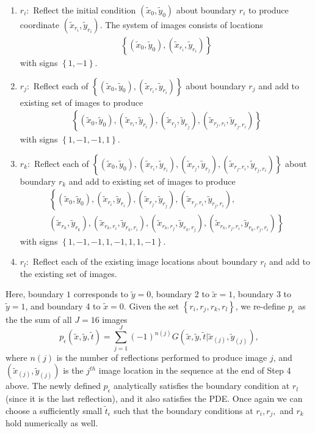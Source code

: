 \begin{enumerate}
\item $r_i:$ Reflect the initial condition
  $(\tilde{x}_0, \tilde{y}_0)$ about boundary $r_i$ to produce
  coordinate $(\tilde{x}_{r_i}, \tilde{y}_{r_i})$. The system of
  images consists of locations
  \begin{align*}
    \left\{(\tilde{x}_0, \tilde{y}_0), (\tilde{x}_{r_i},
  \tilde{y}_{r_i})\right\}
  \end{align*}
  with signs $\left\{1, -1\right\}$.
\item $r_j:$ Reflect each of $\left\{(\tilde{x}_0, \tilde{y}_0), (\tilde{x}_{r_i},
  \tilde{y}_{r_i})\right\}$ about boundary $r_j$ and add to existing set of images to produce
  \begin{align*}
    \left\{ (\tilde{x}_0, \tilde{y}_0), (\tilde{x}_{r_i},
    \tilde{y}_{r_i}), (\tilde{x}_{r_j}, \tilde{y}_{r_j}), (\tilde{x}_{r_j, r_i},
    \tilde{y}_{r_j, r_i}) \right\}
  \end{align*}
  with signs $\left\{1,-1,-1,1\right\}$.

\item $r_k:$ Reflect each of $\left\{ (\tilde{x}_0, \tilde{y}_0), (\tilde{x}_{r_i},
    \tilde{y}_{r_i}), (\tilde{x}_{r_j}, \tilde{y}_{r_j}), (\tilde{x}_{r_j, r_i},
    \tilde{y}_{r_j, r_i}) \right\}$ about boundary $r_k$ and add to existing set of images to produce
  \begin{align*}
    & \left\{ (\tilde{x}_0, \tilde{y}_0), (\tilde{x}_{r_i},
    \tilde{y}_{r_i}), (\tilde{x}_{r_j}, \tilde{y}_{r_j}), (\tilde{x}_{r_j, r_i},
    \tilde{y}_{r_j, r_i}), \right. & \\
    & \left. (\tilde{x}_{r_k}, \tilde{y}_{r_k}), (\tilde{x}_{r_k, r_i},
    \tilde{y}_{r_k, r_i}), (\tilde{x}_{r_k, r_j}, \tilde{y}_{r_k, r_j}), (\tilde{x}_{r_k, r_j, r_i},
    \tilde{y}_{r_k, r_j, r_i})  \right\}&
  \end{align*}
  with signs $\left\{1,-1,-1,1, -1,1,1,-1\right\}$.
\item $r_l:$ Reflect each of the existing image locations about
  boundary $r_l$ and add to the existing set of images.
\end{enumerate}
Here, boundary $1$ corresponds to $\tilde{y}=0$, boundary 2 to
$\tilde{x}=1$, boundary 3 to $\tilde{y}=1$, and boundary 4 to
$\tilde{x} = 0$.  Given the set $\left\{r_i,r_j,r_k,r_l\right\}$, we
re-define $p_\epsilon$ as the the sum of all $J = 16$ images
\begin{equation*}
  p_\epsilon(\tilde{x}, \tilde{y}, \tilde{t}) = \sum_{j=1}^J (-1)^{n(j)}
  G(\tilde{x},\tilde{y},\tilde{t}|\tilde{x}_{(j)},\tilde{y}_{(j)}),
\end{equation*}
where $n(j)$ is the number of reflections performed to produce image
$j$, and $(\tilde{x}_{(j)},\tilde{y}_{(j)})$ is the $j^{th}$ image
location in the sequence at the end of Step 4 above. The newly defined
$p_\epsilon$ analytically satisfies the boundary condition at $r_l$
(since it is the last reflection), and it also satisfies the PDE. Once
again we can choose a sufficiently small $\tilde{t}_\epsilon$ such
that the boundary conditions at $r_i, r_j,$ and $r_k$ hold numerically
as well.

